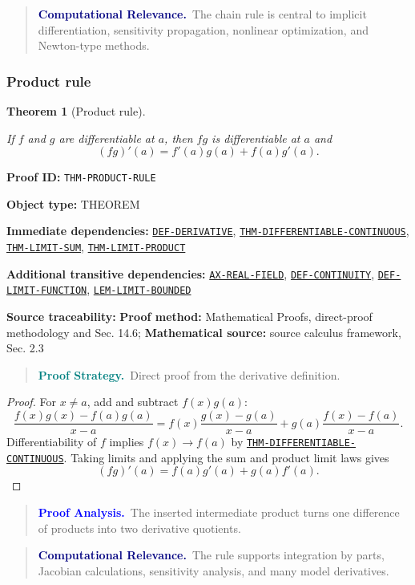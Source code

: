 \documentclass[10pt]{article}
\newcommand{\pidraw}[1]{\begingroup\urlstyle{tt}\nolinkurl{#1}\endgroup}
\newcommand{\pidref}[1]{\hyperref[prf:#1]{\pidraw{#1}}}
\newcommand{\pid}[1]{\pidref{#1}}
\newtheorem{theorem}{Theorem}[section]
\theoremstyle{definition}
\theoremstyle{remark}
\newenvironment{proofstrategy}
{\begin{quote}\small\noindent\textbf{\textcolor{teal}{Proof Strategy.}}\ }
{\end{quote}}
\newenvironment{proofanalysis}
{\begin{quote}\small\noindent\textbf{\textcolor{blue}{Proof Analysis.}}\ }
{\end{quote}}
\newenvironment{computationalrelevance}
{\begin{quote}\small\noindent\textbf{\textcolor{navy}{Computational Relevance.}}\ }
{\end{quote}}
\newcommand{\meta}[2]{\noindent\textbf{#1:} #2\par}
\begin{document}
\begin{computationalrelevance}The chain rule is central to implicit differentiation, sensitivity propagation, nonlinear optimization, and Newton-type methods.\end{computationalrelevance}

\subsubsection{Product rule}

\begin{theorem}[Product rule]\label{prf:THM-PRODUCT-RULE}

If $f$ and $g$ are differentiable at $a$, then $fg$ is differentiable at $a$ and
\[
(fg)'(a)=f'(a)g(a)+f(a)g'(a).
\]

\end{theorem}

\meta{Proof ID}{\pidraw{THM-PRODUCT-RULE}}
\meta{Object type}{THEOREM}
\meta{Immediate dependencies}{\pidref{DEF-DERIVATIVE}, \pidref{THM-DIFFERENTIABLE-CONTINUOUS}, \pidref{THM-LIMIT-SUM}, \pidref{THM-LIMIT-PRODUCT}}
\meta{Additional transitive dependencies}{\pidref{AX-REAL-FIELD}, \pidref{DEF-CONTINUITY}, \pidref{DEF-LIMIT-FUNCTION}, \pidref{LEM-LIMIT-BOUNDED}}
\meta{Source traceability}{\textbf{Proof method:} Mathematical Proofs, direct-proof methodology and Sec. 14.6; \textbf{Mathematical source:} source calculus framework, Sec. 2.3}

\begin{proofstrategy}Direct proof from the derivative definition.\end{proofstrategy}

\begin{proof}

For $x\ne a$, add and subtract $f(x)g(a)$:
\[
\frac{f(x)g(x)-f(a)g(a)}{x-a}
=
f(x)\frac{g(x)-g(a)}{x-a}
+
g(a)\frac{f(x)-f(a)}{x-a}.
\]
Differentiability of $f$ implies $f(x)\to f(a)$ by
\pid{THM-DIFFERENTIABLE-CONTINUOUS}. Taking limits and applying the sum and
product limit laws gives
\[
(fg)'(a)=f(a)g'(a)+g(a)f'(a).
\]

\end{proof}

\begin{proofanalysis}The inserted intermediate product turns one difference of products into two derivative quotients.\end{proofanalysis}

\begin{computationalrelevance}The rule supports integration by parts, Jacobian calculations, sensitivity analysis, and many model derivatives.\end{computationalrelevance}
\end{document}
